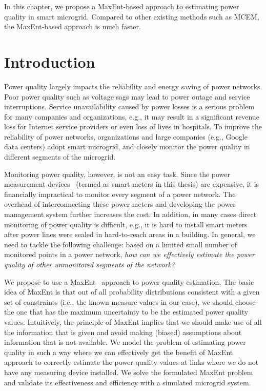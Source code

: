 \label{chap:PQEstimation}
\small
In this chapter, we propose a MaxEnt-based approach to estimating power quality in smart microgrid. Compared to other existing methods such as MCEM, the MaxEnt-based approach is much faster.

\normalsize
\section{Introduction}
Power quality largely impacts the reliability and energy saving of power networks. Poor power quality such as voltage sags may lead to power outage and service interruptions. Service unavailability caused by power losses is a serious problem for many companies and organizations, e.g., it may result in a significant revenue loss for Internet service providers or even loss of lives in hospitals. To improve the reliability of power networks, organizations and large companies (e.g., Google data centers) adopt smart microgrid, and closely monitor the power quality in different segments of the microgrid.

Monitoring power quality, however, is not an easy task. Since the power measurement devices~\cite{fluke_meter}\cite{schneider_meter} (termed as smart meters in this thesis) are expensive, it is financially impractical to monitor every segment of a power network. The overhead of interconnecting these power meters and developing the power management system further increases the cost. In addition, in many cases direct monitoring of power quality is difficult, e.g., it is hard to install smart meters after power lines were sealed in hard-to-reach areas in a building. In general, we need to tackle the following challenge: based on a limited small number of monitored points in a power network, \textit{how can we effectively estimate the power quality of other unmonitored segments of the network?} 

We propose to use a MaxEnt~\cite{maxent} approach to power quality estimation. The basic idea of MaxEnt is that out of all probability distributions consistent with a given set of constraints (i.e., the known measure values in our case), we should choose the one that has the maximum uncertainty to be the estimated power quality values. Intuitively, the principle of MaxEnt implies that we should make use of all the information that is given and avoid making (biased) assumptions about information that is not available. We model the problem of estimating power quality in such a way where we can effectively get the benefit of MaxEnt approach to correctly estimate the power quality values at links where we do not have any measuring device installed. We solve the formulated MaxEnt problem and validate its effectiveness and efficiency with a simulated microgrid system.

